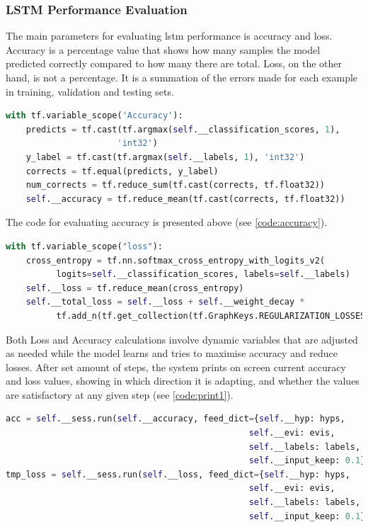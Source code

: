         \subsubsection{LSTM Performance Evaluation} \label{lstmeval}
            The main parameters for evaluating \gls{lstm} performance is accuracy and loss. Accuracy is a percentage value that shows how many samples the model predicted correctly compared to how many there are total. Loss, on the other hand, is not a percentage. It is a summation of the errors made for each example in training, validation and testing sets.
            
            \begin{lstlisting}[language=Python, caption=Accuracy Calculation, label=code:accuracy]
with tf.variable_scope('Accuracy'):
    predicts = tf.cast(tf.argmax(self.__classification_scores, 1), 
                      'int32')
    y_label = tf.cast(tf.argmax(self.__labels, 1), 'int32')
    corrects = tf.equal(predicts, y_label)
    num_corrects = tf.reduce_sum(tf.cast(corrects, tf.float32))
    self.__accuracy = tf.reduce_mean(tf.cast(corrects, tf.float32))
            \end{lstlisting}
            
            The code for evaluating accuracy is presented above (see \cref{code:accuracy}).
            
            \begin{lstlisting}[language=Python, caption=Loss Calculation, label=code:loss]
with tf.variable_scope("loss"):
    cross_entropy = tf.nn.softmax_cross_entropy_with_logits_v2(
          logits=self.__classification_scores, labels=self.__labels)
    self.__loss = tf.reduce_mean(cross_entropy)
    self.__total_loss = self.__loss + self.__weight_decay * 
          tf.add_n(tf.get_collection(tf.GraphKeys.REGULARIZATION_LOSSES))
            \end{lstlisting}
            
            Both Loss and Accuracy calculations involve dynamic variables that are adjusted as needed while the model learns and tries to maximise accuracy and reduce losses. After set amount of steps, the system prints on screen current accuracy and loss values, showing in which direction it is adapting, and whether the values are satisfactory at any given step (see \cref{code:print1}).
            
            \begin{lstlisting}[language=Python, caption=Accuracy and Loss Reporting, label=code:print1]
acc = self.__sess.run(self.__accuracy, feed_dict={self.__hyp: hyps,
                                                self.__evi: evis,
                                                self.__labels: labels,
                                                self.__input_keep: 0.1})
tmp_loss = self.__sess.run(self.__loss, feed_dict={self.__hyp: hyps,
                                                self.__evi: evis,
                                                self.__labels: labels,
                                                self.__input_keep: 0.1})
            \end{lstlisting}
            
